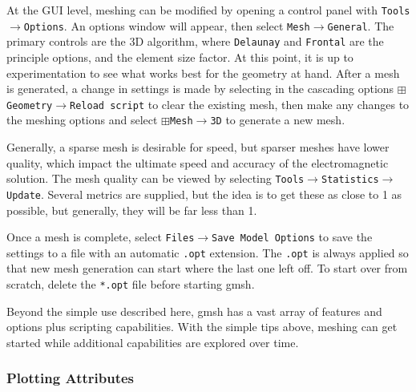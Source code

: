 \documentclass[titlepage]{article}
\renewcommand\_{\textunderscore\linebreak[1]}
\begin{document}
At the GUI level, meshing can be modified by opening a control panel with \texttt{Tools}$\rightarrow$\texttt{Options}.  An options window will appear, then select \texttt{Mesh}$\rightarrow$\texttt{General}.  The primary controls are the 3D algorithm, where \texttt{Delaunay} and \texttt{Frontal} are the principle options, and the element size factor.  At this point, it is up to experimentation to see what works best for the geometry at hand.  After a mesh is generated, a change in settings is made by selecting in the cascading options $\boxplus$\texttt{Geometry}$\rightarrow$\texttt{Reload script} to clear the existing mesh, then make any changes to the meshing options and select $\boxplus$\texttt{Mesh}$\rightarrow$\texttt{3D} to generate a new mesh.

Generally, a sparse mesh is desirable for speed, but sparser meshes have lower quality, which impact the ultimate speed and accuracy of the electromagnetic solution.  The mesh quality can be viewed by selecting \texttt{Tools}$\rightarrow$\texttt{Statistics}$\rightarrow$\texttt{Update}.  Several metrics are supplied, but the idea is to get these as close to 1 as possible, but generally, they will be far less than 1. 

Once a mesh is complete, select  \texttt{Files}$\rightarrow$\texttt{Save Model Options} to save the settings to a file with an automatic \texttt{.opt} extension.  The \texttt{.opt} is always applied so that new mesh generation can start where the last one left off.  To start over from scratch, delete the \texttt{*.opt} file before starting gmsh.

Beyond the simple use described here, gmsh has a vast array of features and options plus scripting capabilities. With the simple tips above, meshing can get started while additional capabilities are explored over time.

\subsubsection{Plotting Attributes}
\end{document}
